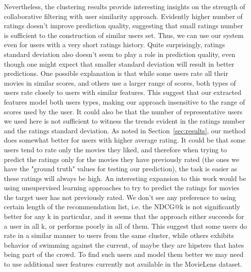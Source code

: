 Nevertheless, the clustering results provide interesting insights on the strength of collaborative filtering with user similarity approach. Evidently higher number of ratings doesn't improve prediction quality, suggesting that small ratings number is sufficient to the construction of similar users set. Thus, we can use our system even for users with a very short ratings history. Quite surprisingly, ratings standard deviation also doesn't seem to play a role in prediction quality, even though one might expect that smaller standard deviation will result in better predictions. One possible explanation is that while some users rate all their movies in similar scores, and others use a larger range of scores, both types of users rate closely to users with similar features. This suggest that our extracted features model both users types, making our approach insensitive to the range of scores used by the user. It could also be that the number of representative users we used here is not sufficient to witness the trends evident in the ratings number and the ratings standard deviation.
As noted in Section~\ref{sec:results}, our method does somewhat better for users with higher average rating. It could be that some users tend to rate only the movies they liked, and therefore when trying to predict the ratings only for the movies they have previously rated (the ones we have the "ground truth" values for testing our prediction), the task is easier as these ratings will always be high. An interesting expansion to this work would be using unsupervised learning approaches to try to predict the ratings for movies the target user has not previously rated. We don't see any preference to using certain length of the recommendation list, i.e. the NDCG@k is not significantly better for any k in particular, and it seems that the approach either succeeds for a user in all k, or performs poorly in all of them. This suggest that some users do rate in a similar manner to users from the same cluster, while others exhibits behavior of swimming against the current, of maybe they are hipsters that hates being part of the crowd. To find such users and model them better we may need to use additional user features currently not available in the MovieLens dataset.

